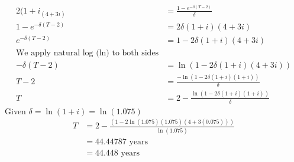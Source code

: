 \documentclass[12pt,a4paper]{article}
\begin{document}
\begin{enumerate}
\begin{align*}
			2(1+i_(4+3i) &=  \frac{  1- e^{-\delta(T-2) }   }{ \delta}\\
			1 -  e^{-\delta(T-2) }  &=  2\delta (1 + i)(4 + 3i)\\
			e^{-\delta(T-2) }  &=  1 -  2\delta (1 + i) (4 +3i)\\ 
			\text{We apply natural log (ln) to both sides}\\
			-\delta(T-2) &=  \ln(1 - 2\delta(1 +i) (4 +3i))\\
			T-2 &= \frac{ -\ln \left(  1 -2 \delta(1+i)  (1 + i)  \right)   }{ \delta }\\
			T &= 2 -   \frac{ \ln \left(  1 -2 \delta(1+i)  (1 + i)  \right)   }{ \delta }
\end{align*}
Given $\delta = \ln(1 + i)  =  \ln(1.075)$\\
\begin{align*}
		T  &=  2 -  \frac{ \left(  1 -2 \ln(1.075) (1.075) (4 + 3(0.075))    \right)  }{ \ln(1.075) }\\
		&= 44.44787 \text{ years}\\
		&= 44.448 \text{ years}
\end{align*}
\end{enumerate}
\end{document}

